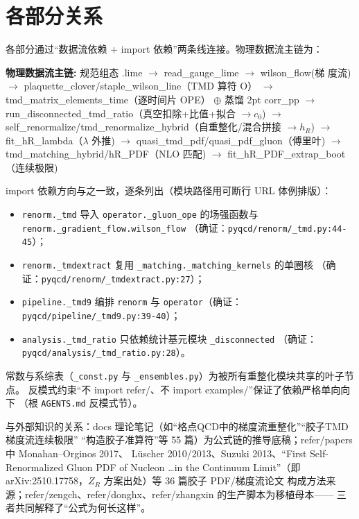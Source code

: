 \documentclass[UTF8]{ctexart}
\begin{document}
\section{各部分关系}

各部分通过``数据流依赖 + import 依赖''两条线连接。物理数据流主链为：

\begin{keybox}
\textbf{物理数据流主链:}
\textcolor{relation}{规范组态 .lime $\to$ read\_gauge\_lime $\to$ wilson\_flow(梯 度流)
$\to$ plaquette\_clover/staple\_wilson\_line（TMD 算符 O）
$\to$ tmd\_matrix\_elements\_time（逐时间片 OPE）
$\oplus$ 蒸馏 2pt corr\_pp $\to$ run\_disconnected\_tmd\_ratio（真空扣除+比值+拟合 $\to c_0$)
$\to$ self\_renormalize/tmd\_renormalize\_hybrid（自重整化/混合拼接 $\to h_R$)
$\to$ fit\_hR\_lambda（$\lambda$ 外推) $\to$ quasi\_tmd\_pdf/quasi\_pdf\_gluon（傅里叶)
$\to$ tmd\_matching\_hybrid/hR\_PDF（NLO 匹配) $\to$ fit\_hR\_PDF\_extrap\_boot（连续极限)}
\end{keybox}

import 依赖方向与之一致，逐条列出（模块路径用可断行 URL 体例排版）：

\begin{itemize}
\item \texttt{\nolinkurl{renorm._tmd}} 导入 \texttt{\nolinkurl{operator._gluon_ope}}
的场强函数与 \texttt{\nolinkurl{renorm._gradient_flow.wilson_flow}}
（确证：\texttt{\nolinkurl{pyqcd/renorm/_tmd.py:44-45}}）；
\item \texttt{\nolinkurl{renorm._tmdextract}} 复用
\texttt{\nolinkurl{_matching._matching_kernels}} 的单圈核
（确证：\texttt{\nolinkurl{pyqcd/renorm/_tmdextract.py:27}}）；
\item \texttt{\nolinkurl{pipeline._tmd9}} 编排 \texttt{renorm} 与
\texttt{operator}（确证：\texttt{\nolinkurl{pyqcd/pipeline/_tmd9.py:39-40}}）；
\item \texttt{\nolinkurl{analysis._tmd_ratio}} 只依赖统计基元模块
\texttt{\nolinkurl{_disconnected}}
（确证：\texttt{\nolinkurl{pyqcd/analysis/_tmd_ratio.py:28}}）。
\end{itemize}

常数与系综表（\texttt{\nolinkurl{_const.py}} 与
\texttt{\nolinkurl{_ensembles.py}}）为被所有重整化模块共享的叶子节点。
反模式约束``不 import refer/、不 import examples/''保证了依赖严格单向向下
（根 \texttt{\nolinkurl{AGENTS.md}} 反模式节）。

与外部知识的关系：docs 理论笔记（如``格点QCD中的梯度流重整化''``胶子TMD梯度流连续极限''
``构造胶子准算符''等 55 篇）为公式链的推导底稿；refer/papers 中 Monahan--Orginos 2017、
L\"uscher 2010/2013、Suzuki 2013、``First Self-Renormalized Gluon PDF of Nucleon \ldots in
the Continuum Limit''（即 arXiv:2510.17758，$Z_R$ 方案出处）等 36 篇胶子 PDF/梯度流论文
构成方法来源；refer/zengch、refer/donghx、refer/zhangxin 的生产脚本为移植母本——
三者共同解释了``公式为何长这样''。
\end{document}
